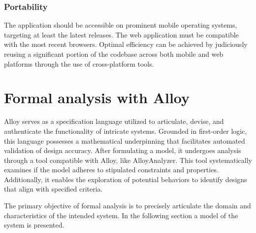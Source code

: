 \documentclass[12pt, a4paper]{report}
\begin{document}
        \subsection{Portability}
        The application should be accessible on prominent mobile operating systems, targeting at least the latest releases. 
        The web application must be compatible with the most recent browsers. 
        Optimal efficiency can be achieved by judiciously reusing a significant portion of the codebase across both mobile and web platforms through the use of cross-platform tools.


\chapter{Formal analysis with Alloy}
Alloy serves as a specification language utilized to articulate, devise, and authenticate the functionality of intricate systems. 
Grounded in first-order logic, this language possesses a mathematical underpinning that facilitates automated validation of design accuracy.
After formulating a model, it undergoes analysis through a tool compatible with Alloy, like AlloyAnalyzer.
This tool systematically examines if the model adheres to stipulated constraints and properties.
Additionally, it enables the exploration of potential behaviors to identify designs that align with specified criteria.

The primary objective of formal analysis is to precisely articulate the domain and characteristics of the intended system.
In the following section a model of the system is presented.
\end{document}
